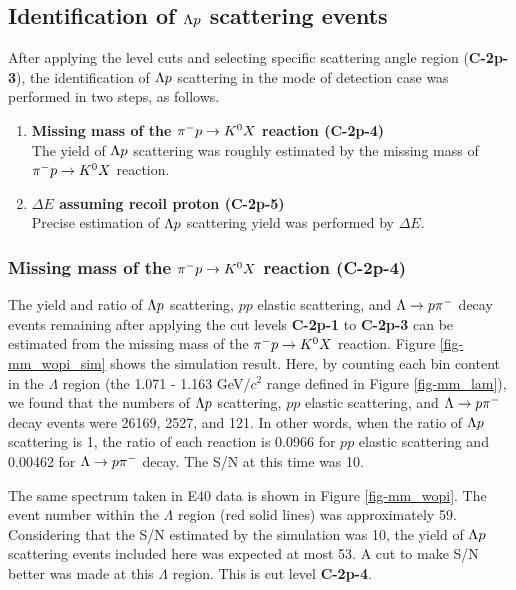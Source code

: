 \clearpage
\subsection{Identification of $\Lambda p$ scattering events}
\label{sec-2p_wo_id}

After applying the  level cuts and selecting specific scattering angle region ({\bf C-2p-3}), the identification of $\Lambda p$ scattering in the  mode of detection case  was performed in two steps, as follows. 

\begin{enumerate}
  \item {\bf Missing mass of the $\pi^- p \to K^0 X$ reaction ({\bf C-2p-4}) } \\
  The yield of $\Lambda p$ scattering was roughly estimated by the missing mass of $\pi^- p \to K^0 X$ reaction.
  \item {\bf $\Delta E$ assuming recoil proton ({\bf C-2p-5}) } \\
  Precise estimation of $\Lambda p$ scattering yield was performed by $\Delta E$.
\end{enumerate}

\subsubsection{Missing mass of the $\pi^- p \to K^0 X$ reaction ({\bf C-2p-4})}

The yield and ratio of $\Lambda p$ scattering, $pp$ elastic scattering, and $\Lambda\to p\pi^{-}$ decay events remaining after applying the cut levels {\bf C-2p-1} to {\bf C-2p-3} can be estimated from the missing mass of the $\pi^- p \to K^0 X$ reaction. Figure \ref{fig-mm_wopi_sim} shows the simulation result. Here, by counting each bin content in the $\Lambda$ region (the 1.071 - 1.163 GeV/$c^{2}$ range defined in Figure \ref{fig-mm_lam}), we found that the numbers of $\Lambda p$ scattering, $pp$ elastic scattering, and $\Lambda\to p\pi^{-}$ decay events were 26169, 2527, and 121. In other words, when the ratio of $\Lambda p$ scattering is 1, the ratio of each reaction is 0.0966 for $pp$ elastic scattering and 0.00462 for $\Lambda\to p\pi^{-}$ decay. The S/N at this time was 10.

The same spectrum taken in E40 data is shown in Figure \ref{fig-mm_wopi}. The event number within the $\Lambda$ region (red solid lines) was approximately 59. Considering that the S/N estimated by the simulation was 10, the yield of $\Lambda p$ scattering events included here was expected at most 53. A cut to make S/N better was made at this $\Lambda$ region. This is cut level {\bf C-2p-4}.

